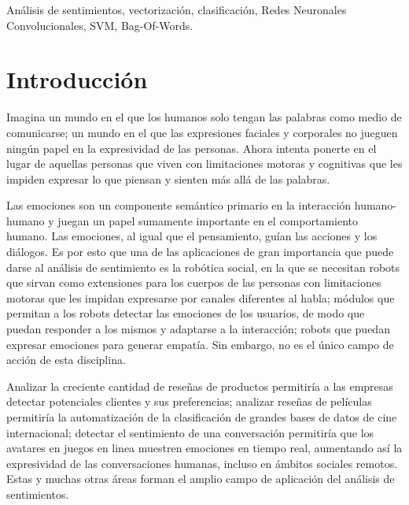 \documentclass[conference]{IEEEtran}
\begin{document}



\begin{IEEEkeywords}
	
	Análisis de sentimientos, vectorización, clasificación, Redes Neuronales Convolucionales, SVM, Bag-Of-Words.
    	
\end{IEEEkeywords}




\section{Introducción}

    Imagina un mundo en el que los humanos solo tengan las palabras como medio de comunicarse; un mundo en el que las expresiones faciales y corporales no jueguen ningún papel en la expresividad de las personas. Ahora intenta ponerte en el lugar de aquellas personas que viven con limitaciones motoras y cognitivas que les impiden expresar lo que piensan y sienten más allá de las palabras.

    Las emociones son un componente semántico primario en la interacción humano-humano y juegan un papel sumamente importante en el comportamiento humano. Las emociones, al igual que el pensamiento, guían las acciones y los diálogos. Es por esto que una de las aplicaciones de gran importancia que puede darse al análisis de sentimiento es la robótica social, en la que se necesitan robots que sirvan como extensiones para los cuerpos de las personas con limitaciones motoras que les impidan expresarse por canales diferentes al habla; módulos que permitan a los robots detectar las emociones de los usuarios, de modo que puedan responder a los mismos y adaptarse a la interacción; robots que puedan expresar emociones para generar empatía. Sin embargo, no es el único campo de acción de esta disciplina.
    
    Analizar la creciente cantidad de reseñas de productos permitiría a las empresas detectar potenciales clientes y sus preferencias; analizar reseñas de películas permitiría la automatización de la clasificación de grandes bases de datos de cine internacional; detectar el sentimiento de una conversación permitiría que los avatares en juegos en linea muestren emociones en tiempo real, aumentando así la expresividad de las conversaciones humanas, incluso en ámbitos sociales remotos. Estas y muchas otras áreas forman el amplio campo de aplicación del análisis de sentimientos.
    
\end{document}
